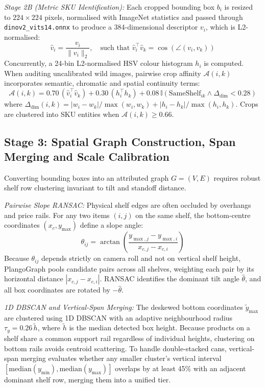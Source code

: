\documentclass[conference]{IEEEtran}
\begin{document}
\textit{Stage 2B (Metric SKU Identification):} Each cropped bounding box $b_i$ is resized to $224 \times 224$ pixels, normalised with ImageNet statistics and passed through \texttt{dinov2\_vits14.onnx} to produce a 384-dimensional descriptor $v_i$, which is L2-normalised:
\begin{equation}
\hat{v}_i = \frac{v_i}{\|v_i\|_2}, \quad \text{such that } \hat{v}_i^\top \hat{v}_k = \cos(\angle(v_i, v_k))
\end{equation}
Concurrently, a 24-bin L2-normalised HSV colour histogram $h_i$ is computed. When auditing uncalibrated wild images, pairwise crop affinity $\mathcal{A}(i, k)$ incorporates semantic, chromatic and spatial continuity terms:
\begin{equation}
\mathcal{A}(i, k) = 0.70\,(\hat{v}_i^\top \hat{v}_k) + 0.30\,(h_i^\top h_k) + 0.08\,\mathbb{I}(\text{SameShelf}_{ik} \wedge \Delta_{\text{dim}} < 0.28)
\end{equation}
where $\Delta_{\text{dim}}(i,k) = |w_i - w_k|/\max(w_i, w_k) + |h_i - h_k|/\max(h_i, h_k)$. Crops are clustered into SKU entities when $\mathcal{A}(i, k) \ge 0.66$.

\subsection{Stage 3: Spatial Graph Construction, Span Merging and Scale Calibration}
Converting bounding boxes into an attributed graph $G = (V, E)$ requires robust shelf row clustering invariant to tilt and standoff distance.

\textit{Pairwise Slope RANSAC:} Physical shelf edges are often occluded by overhangs and price rails. For any two items $(i, j)$ on the same shelf, the bottom-centre coordinates $(x_{c}, y_{\max})$ define a slope angle:
\begin{equation}
\theta_{ij} = \arctan\left(\frac{y_{\max,j} - y_{\max,i}}{x_{c,j} - x_{c,i}}\right)
\end{equation}
Because $\theta_{ij}$ depends strictly on camera roll and not on vertical shelf height, PlangoGraph pools candidate pairs across all shelves, weighting each pair by its horizontal distance $|x_{c,j} - x_{c,i}|$. RANSAC identifies the dominant tilt angle $\hat{\theta}$, and all box coordinates are rotated by $-\hat{\theta}$.

\textit{1D DBSCAN and Vertical-Span Merging:} The deskewed bottom coordinates $\tilde{y}_{\max}$ are clustered using 1D DBSCAN with an adaptive neighbourhood radius $\tau_y = 0.26\,\tilde{h}$, where $\tilde{h}$ is the median detected box height. Because products on a shelf share a common support rail regardless of individual heights, clustering on bottom rails avoids centroid scattering. To handle double-stacked cans, vertical-span merging evaluates whether any smaller cluster's vertical interval $[\text{median}(y_{\min}), \text{median}(y_{\max})]$ overlaps by at least 45\% with an adjacent dominant shelf row, merging them into a unified tier.
\end{document}
